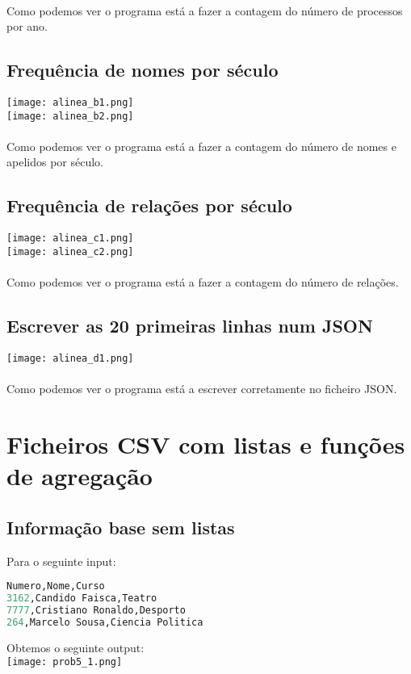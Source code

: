 \documentclass[11pt,a4paper]{report}
\begin{document}
    \paragraph{}
    Como podemos ver o programa está a fazer a contagem do número de processos por ano.
    
    \subsection{Frequência de nomes por século}
    \texttt{[image: alinea\_b1.png]} \\
	\texttt{[image: alinea\_b2.png]}
    \paragraph{}
    Como podemos ver o programa está a fazer a contagem do número de nomes e apelidos por século.

    \subsection{Frequência de relações por século}
    \texttt{[image: alinea\_c1.png]} \\
    \texttt{[image: alinea\_c2.png]}

    \paragraph{}
    Como podemos ver o programa está a fazer a contagem do número de relações.

    \subsection{Escrever as 20 primeiras linhas num JSON}
    \texttt{[image: alinea\_d1.png]} \\
    \paragraph{}
    Como podemos ver o programa está a escrever corretamente no ficheiro JSON.

\section{Ficheiros CSV com listas e funções de agregação}
    \subsection{Informação base sem listas} 
    Para o seguinte input:
\begin{lstlisting}[language=Python]
Numero,Nome,Curso
3162,Candido Faisca,Teatro
7777,Cristiano Ronaldo,Desporto
264,Marcelo Sousa,Ciencia Politica
\end{lstlisting}
Obtemos o seguinte output: \\
\texttt{[image: prob5\_1.png]} \\
\end{document}
